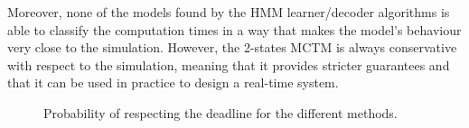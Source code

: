 Moreover, none of the models found by the HMM learner/decoder algorithms is able
to classify the computation times in a way that makes the model's behaviour very
close to the simulation. However, the 2-states MCTM is always conservative
with respect to the simulation, meaning that it provides stricter guarantees and
that it can be used in practice to design a real-time system.
\begin{figure}[!htb]
    \caption{Probability of respecting the deadline for the different methods.}
    \label{img:deadline_comparison}
\end{figure}
